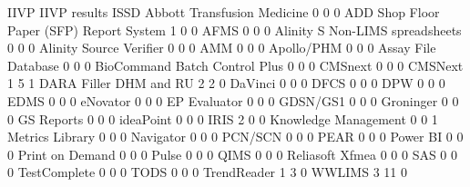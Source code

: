 \documentclass{article}
\begin{document}
\begin{Schunk}
\begin{Soutput}
                                           IIVP IIVP results ISSD
  Abbott Transfusion Medicine                 0            0    0
  ADD Shop Floor Paper (SFP) Report System    1            0    0
  AFMS                                        0            0    0
  Alinity S Non-LIMS spreadsheets             0            0    0
  Alinity Source Verifier                     0            0    0
  AMM                                         0            0    0
  Apollo/PHM                                  0            0    0
  Assay File Database                         0            0    0
  BioCommand Batch Control Plus               0            0    0
  CMSnext                                     0            0    0
  CMSNext                                     1            5    1
  DARA Filler DHM and RU                      2            2    0
  DaVinci                                     0            0    0
  DFCS                                        0            0    0
  DPW                                         0            0    0
  EDMS                                        0            0    0
  eNovator                                    0            0    0
  EP Evaluator                                0            0    0
  GDSN/GS1                                    0            0    0
  Groninger                                   0            0    0
  GS Reports                                  0            0    0
  ideaPoint                                   0            0    0
  IRIS                                        2            0    0
  Knowledge Management                        0            0    1
  Metrics Library                             0            0    0
  Navigator                                   0            0    0
  PCN/SCN                                     0            0    0
  PEAR                                        0            0    0
  Power BI                                    0            0    0
  Print on Demand                             0            0    0
  Pulse                                       0            0    0
  QIMS                                        0            0    0
  Reliasoft Xfmea                             0            0    0
  SAS                                         0            0    0
  TestComplete                                0            0    0
  TODS                                        0            0    0
  TrendReader                                 1            3    0
  WWLIMS                                      3           11    0


\end{Soutput}
\end{Schunk}
\end{document}

